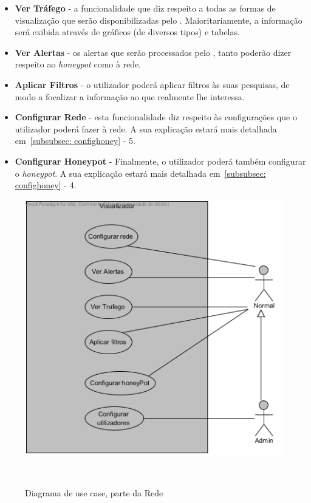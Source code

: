 \begin{itemize}
 \item \textbf{Ver Tráfego} - a funcionalidade que diz respeito a todas as formas de visualização que serão disponibilizadas pelo \visualz. Maioritariamente, a informação será exibida através de gráficos (de diversos tipos) e tabelas.
 \item \textbf{Ver Alertas} - os alertas que serão processados pelo \visualz, tanto poderão dizer respeito ao \emph{honeypot} como à rede.
 \item \textbf{Aplicar Filtros} - o utilizador poderá aplicar filtros às suas pesquisas, de modo a focalizar a informação ao que realmente lhe interessa.
 \item \textbf{Configurar Rede} - esta funcionalidade diz respeito às configurações que o utilizador poderá fazer à rede. A sua explicação estará mais detalhada em~\ref{subsubsec: confighoney} - 5.
 \item \textbf{Configurar Honeypot} - Finalmente, o utilizador poderá também configurar o \emph{honeypot}. A sua explicação estará mais detalhada em~\ref{subsubsec: confighoney} - 4.
\end{itemize}

\begin{figure}[!htb]
	\centering
	\includegraphics[scale=0.80]{images/ucs/Visualizador}
	\caption {Diagrama de use case, parte da Rede}~\label{fig: casodeusovisual}
\end{figure}
\pagebreak


